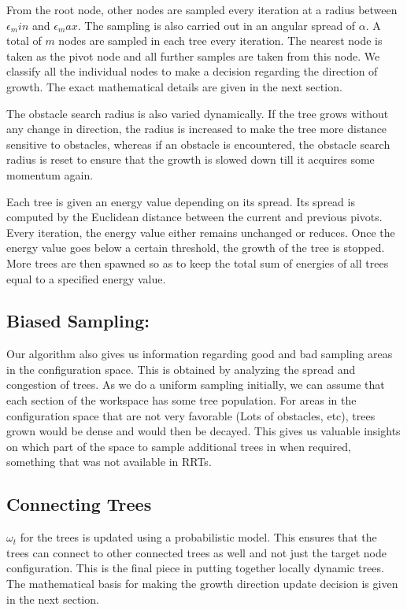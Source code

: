 \documentclass[fleqn]{article}
\begin{document}
	From the root node, other nodes are sampled every iteration at a radius between $\epsilon_min$ and $\epsilon_max$. The sampling is also carried out in an angular spread of $\alpha$. A total of $m$ nodes are sampled in each tree every iteration. The nearest node is taken as the pivot node and all further samples are taken from this node. We classify all the individual nodes to make a decision regarding the direction of growth. The exact mathematical details are given in the next section.
	
	The obstacle search radius is also varied dynamically. If the tree grows without any change in direction, the radius is increased to make the tree more distance sensitive to obstacles, whereas if an obstacle is encountered, the obstacle search radius is reset to ensure that the growth is slowed down till it acquires some momentum again.
	
	Each tree is given an energy value depending on its spread. Its spread is computed by the Euclidean distance between the current and previous pivots. Every iteration, the energy value either remains unchanged or reduces. Once the energy value goes below a certain threshold, the growth of the tree is stopped. More trees are then spawned so as to keep the total sum of energies of all trees equal to a specified energy value.
	
	\subsection*{Biased Sampling:} Our algorithm also gives us information regarding good and bad sampling areas in the configuration space. This is obtained by analyzing the spread and congestion of trees. As we do a uniform sampling initially, we can assume that each section of the workspace has some tree population. For areas in the configuration space that are not very favorable (Lots of obstacles, etc), trees grown would be dense and would then be decayed. This gives us valuable insights on which part of the space to sample additional trees in when required, something that was not available in RRTs.
	
	\subsection*{Connecting Trees} $\omega_t$ for the trees is updated using a probabilistic model. This ensures that the trees can connect to other connected trees as well and not just the target node configuration. This is the final piece in putting together locally dynamic trees. The mathematical basis for making the growth direction update decision is given in the next section.
	
\end{document}
